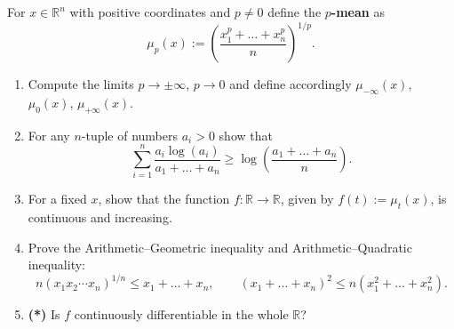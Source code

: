 
\begin{exercise}
\label{ex:p_means_monotonicity}
For $x \in \mathbb{R}^n$ with positive coordinates and $p \neq 0$ define the \textbf{$p$-mean} as
$$\mu_p(x) := \left(\frac{x_1^p + \dots + x_n^p}{n}\right)^{1/p}.$$
\begin{enumerate}[label=\textbf{(\alph*)}]
  \item Compute the limits $p \to \pm\infty$, $p \to 0$ and define accordingly
    $\mu_{-\infty}(x)$, $\mu_0(x)$, $\mu_{+\infty}(x)$.
  \item For any $n$-tuple of numbers $a_i > 0$ show that
$$\sum_{i=1}^{n} \frac{a_i\log(a_i)}{a_1 + \dots + a_n} \geq \log\left(\frac{a_1 + \dots + a_n}{n}\right).$$
  \item For a fixed $x$, show that the function $f : \mathbb{R}\to\mathbb{R}$, given by
    $f(t) := \mu_t(x)$, is continuous and increasing.
  \item Prove the Arithmetic--Geometric inequality and Arithmetic--Quadratic inequality:
    $$n(x_1x_2\cdots x_n)^{1/n} \leq x_1 + \dots + x_n, \qquad (x_1+\dots+x_n)^2 \leq n(x_1^2+\dots+x_n^2).$$
  \item \textbf{(*)} Is $f$ continuously differentiable in the whole $\mathbb{R}$?
\end{enumerate}
\end{exercise}
